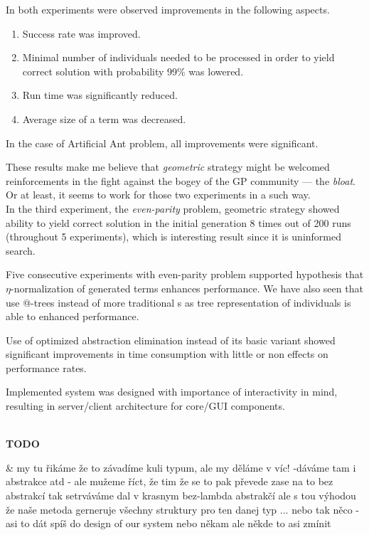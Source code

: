 \documentclass[12pt,a4paper]{report}
\makeatletter
\newcommand{\atTree}{@-tree\xspace}
\newenvironment{todo}
{ ~\\[0.5em]
  {\color{red}\textbf{TODO}}
  \begin{easylist}[itemize]}
{ \end{easylist}
  ~}
\makeatother
\begin{document}
In both experiments were observed improvements in the following aspects.

\begin{enumerate}
 \item Success rate was improved.
 \item Minimal number of individuals needed to be processed in order to yield 
       correct solution with probability 99\% was lowered.
 \item Run time was significantly reduced. 
 \item Average size of a term was decreased.
\end{enumerate}

In the case of Artificial Ant problem, all improvements were significant.

These results make me believe that \textit{geometric} strategy might
be welcomed reinforcements in the fight against the bogey of 
the GP community --- the \textit{bloat}.
Or at least, it seems to work for those two experiments in a such way.\\


In the third experiment, the \textit{even-parity} problem, geometric strategy 
showed ability to yield correct solution in the initial generation
8 times out of 200 runs (throughout 5 experiments), which is interesting
result since it is uninformed search. 

Five consecutive experiments with even-parity problem supported 
hypothesis that $\eta$-normalization of generated terms enhances performance.
We have also seen that use \atTree{}s instead of more traditional \sexprTree{}s
as tree representation of individuals is able to enhanced performance.

Use of optimized abstraction elimination instead of its basic variant 
showed significant improvements in time consumption with little or 
non effects on performance rates.

Implemented system was designed with importance of interactivity in mind,
resulting in server/client architecture for core/GUI components.

\newpage
\begin{todo}
 & my tu řikáme že to závadíme kuli typum, ale my děláme v víc! -dáváme tam
   i abstrakce atd - ale mužeme říct, že tim že se to pak převede zase na 
   to bez abstrakcí tak setrváváme dal v krasnym bez-lambda abstrakčí ale
   s tou výhodou že naše metoda gerneruje všechny struktury pro ten danej typ ...
   nebo tak něco - asi to dát spíš do design of our system nebo někam
   ale někde to asi zmínit
\end{todo}
\end{document}
